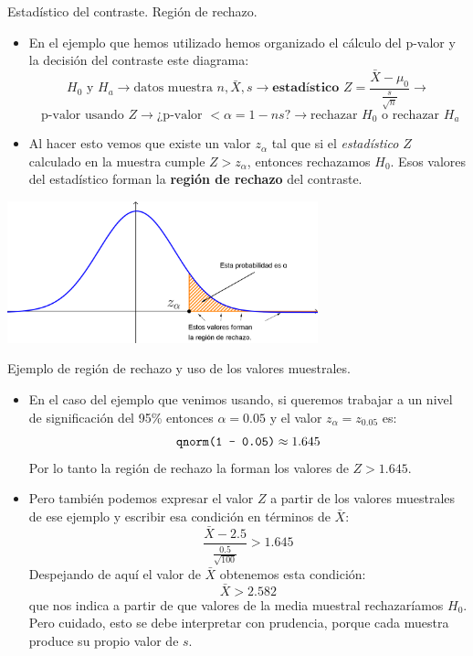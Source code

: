 \documentclass[
  9pt,
  ignorenonframetext,
]{beamer}
\providecommand{\tightlist}{%
  \setlength{\itemsep}{0pt}\setlength{\parskip}{0pt}}
\begin{document}
\begin{frame}{Estadístico del contraste. Región de rechazo.}
\protect\hypertarget{estadistico-del-contraste.-region-de-rechazo.}{}

\begin{itemize}
\tightlist
\item
  En el ejemplo que hemos utilizado hemos organizado el cálculo del
  p-valor y la decisión del contraste este diagrama: \[
  H_0\text{ y }H_a \longrightarrow
  \text{datos muestra }n, \bar X, s \longrightarrow
  \textbf{estadístico }Z = \dfrac{\bar X - \mu_0}{\frac{s}{\sqrt{n}}} \longrightarrow
  \] \[
  \text{ p-valor usando  }Z \longrightarrow 
  \text{¿p-valor }< \alpha = 1 - ns\text{?} \longrightarrow
  \text{rechazar } H_0 \text{ o rechazar }H_a
  \]
\item
  Al hacer esto vemos que existe un valor \(z_{\alpha}\) tal que si el
  \emph{estadístico} \(Z\) calculado en la muestra cumple
  \(Z > z_{\alpha}\), entonces rechazamos \(H_0\). Esos valores del
  estadístico forman la \textbf{región de rechazo} del contraste.
\end{itemize}

\begin{center}\includegraphics[width=9cm]{../fig/07-02-RegionRechazoNormalColaDerecha} \end{center}

\end{frame}

\begin{frame}{Ejemplo de región de rechazo y uso de los valores
muestrales.}
\protect\hypertarget{ejemplo-de-region-de-rechazo-y-uso-de-los-valores-muestrales.}{}

\begin{itemize}
\item
  En el caso del ejemplo que venimos usando, si queremos trabajar a un
  nivel de significación del 95\% entonces \(\alpha = 0.05\) y el valor
  \(z_{\alpha} = z_{0.05}\) es: \[
  \text{\tt qnorm(1 - 0.05)} \approx 1.645 
  \] Por lo tanto la región de rechazo la forman los valores de
  \(Z > 1.645\).
\item
  Pero también podemos expresar el valor \(Z\) a partir de los valores
  muestrales de ese ejemplo y escribir esa condición en términos de
  \(\bar X\): \[
  \dfrac{\bar X - 2.5}{\frac{0.5}{\sqrt{100}}} > 1.645
  \] Despejando de aquí el valor de \(\bar X\) obtenemos esta condición:
  \[
  \bar X >  2.582
  \] que nos indica a partir de que valores de la media muestral
  rechazaríamos \(H_0\). Pero cuidado, esto se debe interpretar con
  prudencia, porque cada muestra produce su propio valor de \(s\).
\end{itemize}

\end{frame}
\end{document}
